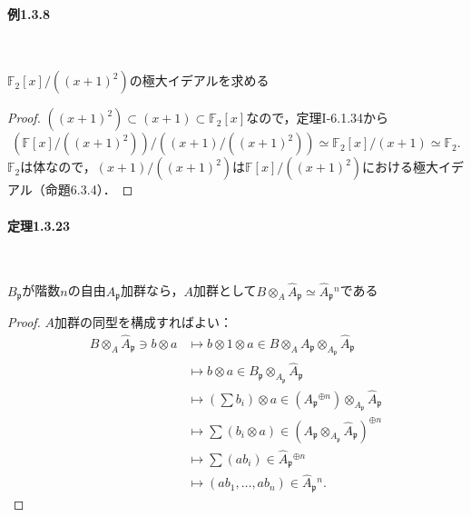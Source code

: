 \paragraph{例1.3.8}~
\begin{screen}
  $\mathbb{F}_2[x]/((x + 1)^2)$の極大イデアルを求める
\end{screen}
\begin{proof}
  $((x + 1)^2)\subset(x + 1)\subset\mathbb{F}_2[x]$なので，定理I-6.1.34から
  \[(\mathbb{F}[x]/((x + 1)^2))/((x + 1)/((x + 1)^2))\simeq\mathbb{F}_2[x]/(x + 1)\simeq\mathbb{F}_2.\]
  $\mathbb{F}_2$は体なので，$(x + 1)/((x + 1)^2)$は$\mathbb{F}[x]/((x + 1)^2)$における極大イデアル（命題6.3.4）．
\end{proof}

\paragraph{定理1.3.23}~
\begin{screen}
  $B_\mathfrak{p}$が階数$n$の自由$A_\mathfrak{p}$加群なら，$A$加群として$B\otimes_A\widehat{A}_\mathfrak{p}\simeq\widehat{A}_\mathfrak{p}{}^n$である
\end{screen}
\begin{proof}
  $A$加群の同型を構成すればよい：
  \begin{align*}
    B\otimes_A\widehat{A}_\mathfrak{p} \ni b \otimes a &\mapsto b \otimes 1 \otimes a \in B\otimes_A A_\mathfrak{p} \otimes_{A_\mathfrak{p}} \widehat{A}_\mathfrak{p} \\
    &\mapsto b \otimes a \in B_\mathfrak{p} \otimes_{A_\mathfrak{p}} \widehat{A}_\mathfrak{p} \\
    &\mapsto \left(\sum b_i\right) \otimes a \in \left(A_\mathfrak{p}{}^{\oplus n}\right)\otimes_{A_\mathfrak{p}}\widehat{A}_\mathfrak{p} \\
    &\mapsto \sum\left(b_i \otimes a\right) \in \left(A_\mathfrak{p}\otimes_{A_\mathfrak{p}}\widehat{A}_\mathfrak{p}\right)^{\oplus n} \\
    &\mapsto \sum\left(ab_i\right) \in \widehat{A}_\mathfrak{p}{}^{\oplus n} \\
    &\mapsto (ab_1, \ldots, ab_n) \in \widehat{A}_\mathfrak{p}{}^n.
  \end{align*}
\end{proof}

